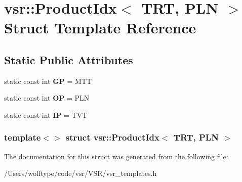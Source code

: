 \hypertarget{structvsr_1_1_product_idx_3_01_t_r_t_00_01_p_l_n_01_4}{\section{vsr\-:\-:Product\-Idx$<$ T\-R\-T, P\-L\-N $>$ Struct Template Reference}
\label{structvsr_1_1_product_idx_3_01_t_r_t_00_01_p_l_n_01_4}
}
\subsection*{Static Public Attributes}
\begin{DoxyCompactItemize}
\item 
\hypertarget{structvsr_1_1_product_idx_3_01_t_r_t_00_01_p_l_n_01_4_a54c478bc4df6cced16591178f1de59ef}{static const int {\bfseries G\-P} = M\-T\-T}\label{structvsr_1_1_product_idx_3_01_t_r_t_00_01_p_l_n_01_4_a54c478bc4df6cced16591178f1de59ef}

\item 
\hypertarget{structvsr_1_1_product_idx_3_01_t_r_t_00_01_p_l_n_01_4_a54b59d2bc076f8ff0416f68314f65d36}{static const int {\bfseries O\-P} = P\-L\-N}\label{structvsr_1_1_product_idx_3_01_t_r_t_00_01_p_l_n_01_4_a54b59d2bc076f8ff0416f68314f65d36}

\item 
\hypertarget{structvsr_1_1_product_idx_3_01_t_r_t_00_01_p_l_n_01_4_ae0618cf77a01680e904dabccdd3d0fc6}{static const int {\bfseries I\-P} = T\-V\-T}\label{structvsr_1_1_product_idx_3_01_t_r_t_00_01_p_l_n_01_4_ae0618cf77a01680e904dabccdd3d0fc6}

\end{DoxyCompactItemize}
\subsubsection*{template$<$$>$ struct vsr\-::\-Product\-Idx$<$ T\-R\-T, P\-L\-N $>$}



The documentation for this struct was generated from the following file\-:\begin{DoxyCompactItemize}
\item 
/\-Users/wolftype/code/vsr/\-V\-S\-R/vsr\-\_\-templates.\-h\end{DoxyCompactItemize}
